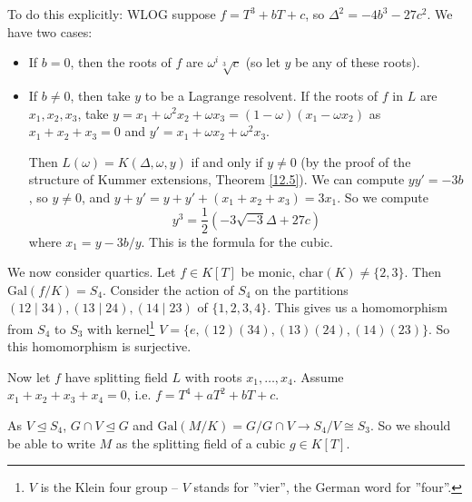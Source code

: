 \documentclass{article}
\theoremstyle{definition}
\begin{document}
To do this explicitly: WLOG suppose $f=T^3+bT+c$, so $\Delta^2 = -4b^3-27c^2$. We have two cases:
\begin{itemize}
    \item If $b=0$, then the roots of $f$ are $\omega^i \sqrt[3]{c}$ (so let $y$ be any of these roots).
    \item If $b\neq0$, then take $y$ to be a Lagrange resolvent. If the roots of $f$ in $L$ are $x_1,x_2,x_3$, take $y=x_1+\omega^2 x_2 + \omega x_3 = (1-\omega)(x_1 - \omega x_2)$ as $x_1+x_2+x_3=0$ and $y' = x_1 +\omega x_2 + \omega^2 x_3$. 
    \vspace{1mm}
    
    Then $L(\omega)=K(\Delta,\omega,y)$ if and only if $y \neq 0$ (by the proof of the structure of Kummer extensions, Theorem \ref{12.5}). We can compute $y y' = -3b$, so $y \neq 0$, and $y+y' = y + y' + (x_1+x_2+x_3) = 3x_1$. So we compute \[
    y^3 = \frac{1}{2}(-3\sqrt{-3}\Delta+27c)
    \]
    where $x_1 = y -3b/y$. This is the formula for the cubic.
\end{itemize}
\vspace{1mm}

We now consider quartics. Let $f \in K[T]$ be monic, $\text{char}(K) \neq \{2,3\}$. Then $\text{Gal}(f/K)=S_4$. Consider the action of $S_4$ on the partitions $(12 \mid 34), (13 \mid 24), (14 \mid 23)$ of $\{1,2,3,4\}$. This gives us a homomorphism from $S_4$ to $S_3$ with kernel\footnote{$V$ is the Klein four group -- $V$ stands for ''vier'', the German word for ''four''.} $V= \{e,(12)(34),(13)(24),(14)(23)\}$. So this homomorphism is surjective.
\vspace{1mm} 

Now let $f$ have splitting field $L$ with roots $x_1,\ldots,x_4$. Assume $x_1+x_2+x_3+x_4=0$, i.e. $f=T^4+aT^2+bT+c$.

\begin{figure}[H]
    \centering
\end{figure}
As $V \trianglelefteq S_4$, $G \cap V \trianglelefteq G$ and $\text{Gal}(M/K) = G/G \cap V \to S_4/V \cong S_3$. So we should be able to write $M$ as the splitting field of a cubic $g \in K[T]$.
\vspace{1mm}
\end{document}
